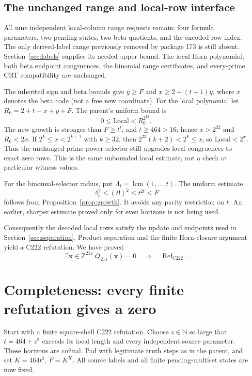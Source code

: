 \documentclass[11pt,a4paper]{article}
\theoremstyle{definition}
\newcommand{\Z}{\mathbb Z}
\newcommand{\N}{\mathbb N}
\newcommand{\Crefut}{\operatorname{Ref}_{\mathrm{C222}}}
\newcommand{\Qdiag}{Q_{214}}
\begin{document}
\subsection{The unchanged range and local-row interface}

All nine independent local-column range requests remain: four formula
parameters, two pending states, two beta quotients, and the encoded row
index. The only derived-label range previously removed by package 173
is still absent. Section~\ref{sec:labels} supplies its needed upper bound.
The local Horn polynomial, both beta endpoint congruences, the binomial
range certificates, and every-prime CRT compatibility are unchanged.

The inherited sign and beta bounds give $y\ge F$ and
$x\ge2+(t+1)y$, where $x$ denotes the beta code (not a free new coordinate).
For the local polynomial let $R_0=2+t+x+y+F$. The parent's uniform bound
is
\[
 0\le\mathrm{Local}<R_0^{2^{23}}.
\]
The new growth is stronger than $F\ge t^t$, and $t\ge464>16$; hence
$x>2^{32}$ and $R_0<2x$. If $2^k\le x<2^{k+1}$ with $k\ge32$, then
$2^{23}(k+2)<2^k\le x$, so $\mathrm{Local}<2^x$. Thus the unchanged
prime-power selector still upgrades local congruences to exact zero
rows. This is the same unbounded local estimate, not a check at particular
witness values.

For the binomial-selector radius, put
$\Lambda_t=\operatorname{lcm}(1,\ldots,t)$. The uniform estimate
\begin{equation}\label{eq:radius}
 \Lambda_t^2\le(t!)^2\le t^{2t}\le F
\end{equation}
follows from Proposition~\ref{prop:growth}. It avoids any parity
restriction on $t$. An earlier, sharper estimate proved only for even
horizons is not being used.

Consequently the decoded local rows satisfy the update and endpoints
used in Section~\ref{sec:separation}. Product separation and the
finite Horn-closure argument yield a C222 refutation. We have proved
\begin{equation}\label{eq:sound}
 \exists\mathbf x\in\Z^{214}\;\Qdiag(\mathbf x)=0
 \quad\Longrightarrow\quad\Crefut.
\end{equation}

\section{Completeness: every finite refutation gives a zero}

Start with a finite square-shell C222 refutation. Choose $z\in\N$ so
large that $t=464+z^2$ exceeds its local length and every independent
source parameter. These horizons are cofinal. Pad with legitimate truth
steps as in the parent, and set $K=464t^2$, $F=K^K$. All source labels
and all finite pending-multiset states are now fixed.
\end{document}
